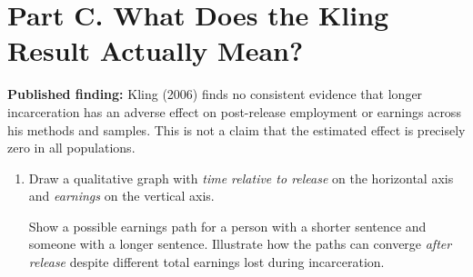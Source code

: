\documentclass[11pt]{article}
\newif\ifinstructor
\newcommand{\answer}[1]{%
\ifinstructor
\par\smallskip\noindent
{\color{blue!55!black}\small
\textbf{Suggested answer:} #1}
\par
\fi
}
\begin{document}
\section*{Part C. What Does the Kling Result Actually Mean?}

\noindent\textbf{Published finding:}
Kling (2006) finds no consistent evidence that longer incarceration
has an adverse effect on post-release employment or earnings across
his methods and samples.
This is not a claim that the estimated effect is precisely zero
in all populations.

\begin{enumerate}[resume]

\item Draw a qualitative graph with
\emph{time relative to release} on the horizontal axis and
\emph{earnings} on the vertical axis.

Show a possible earnings path for a person with a shorter sentence
and someone with a longer sentence.
Illustrate how the paths can converge \emph{after release}
despite different total earnings lost during incarceration.

\answer{
A valid sketch has the longer-sentence group confined for more time,
with additional foregone earnings during that period, but depicts
similar earnings trajectories when both are measured at a common
duration since their respective releases.
Aligning people by release date is crucial.
This graph is conceptual, not a figure from Kling.

\begin{figure}[h!]
\centering
\begin{tikzpicture}
\begin{axis}[
    width=0.9\textwidth,
    height=0.5\textwidth,
    xmin=-24, xmax=24,
    ymin=0, ymax=11,
    axis lines=left,
    xlabel={Time relative to release},
    ylabel={Earnings},
    xtick={-24,-12,0,12,24},
    xticklabels={-24,-12,0,12,24},
    ytick=\empty,
    clip=false,
    legend style={
        at={(0.98,0.98)},
        anchor=north east,
        draw=none,
        fill=none
    }
]

\addplot[dashed, black] coordinates {(0,0) (0,10.5)};
\node[above] at (axis cs:0,10.5) {Release};

\addplot[thick, blue] coordinates {
    (-24,6.5)
    (-12,6.5)
    (-12,0.4)
    (0,0.4)
    (6,4.0)
    (12,5.8)
    (24,6.6)
};


\end{axis}
\end{tikzpicture}
\end{figure}}
\end{enumerate}
\end{document}
